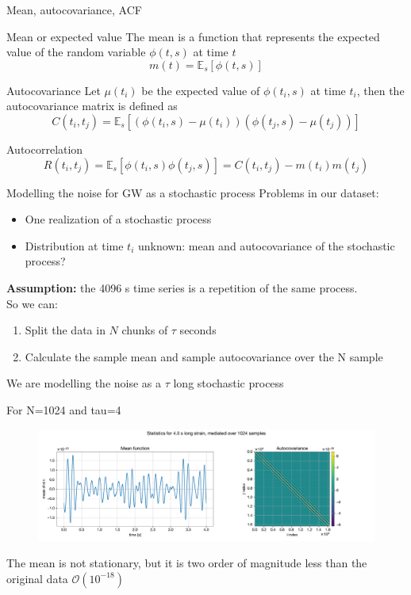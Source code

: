 \documentclass[
10pt,
aspectratio=169,
]{beamer}
\begin{document}
\begin{frame}{Mean, autocovariance, ACF}

\begin{block}{Mean or expected value}
The mean is a function that represents the expected value of the random variable $\phi(t,s)$ at time $t$
	\[m(t) = \mathbb{E}_s[\phi(t,s)]  \] %
\end{block}

\begin{block}{Autocovariance}
Let $\mu(t_i)$ be the expected value of $\phi(t_i,s)$ at time $t_i$, then the autocovariance matrix is defined as
	\[C(t_i,t_j) = \mathbb{E}_s[(\phi(t_i,s) - \mu(t_i))(\phi(t_j,s) - \mu(t_j))] \]
\end{block}

\begin{block}{Autocorrelation}
\[R(t_i,t_j) = \mathbb{E}_s[\phi(t_i,s)\phi(t_j,s)] = C(t_i,t_j)- m(t_i) m(t_j)\]
\end{block}

\end{frame}	
\begin{frame}{Modelling the noise for GW as a stochastic process}
Problems in our dataset:
\pause
    \begin{itemize}

        \item One realization of a stochastic process
        \item Distribution at time $t_i$ unknown: mean and autocovariance of the stochastic process?
    \end{itemize}
    \pause
     \vfill
\textbf{Assumption:} the 4096 s time series is a repetition of the same process.\\
\pause \vfill
So we can:
\begin{enumerate}
    \item Split the data in $N$ chunks of $\tau$ seconds
    \item Calculate the sample mean and sample autocovariance over the N sample 
\end{enumerate}
\vfill
We are modelling the noise as a $\tau$ long stochastic process
\end{frame}

\begin{frame}{For N=1024 and tau=4}
    \begin{figure}
        \centering
        \includegraphics[width=\linewidth]{stat4.0_s.pdf}
    \end{figure}
    The mean is not stationary, but it is two order of magnitude less than the original data $\mathcal{O}(10^{-18})$
\end{frame}
\end{document}
